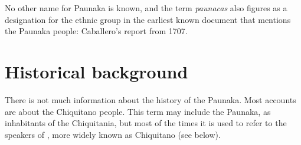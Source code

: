 No other name for Paunaka is known, and the term \textit{paunacas} also figures as a designation for the ethnic group in the earliest known document that mentions the Paunaka people: Caballero’s report from 1707. %



\section{Historical background}\label{sec:HistoricalBackground}

There is not much information about the history of the Paunaka. Most accounts are about the Chiquitano people. This term may include the Paunaka, as inhabitants of the Chiquitania, but most of the times it is used to refer to the speakers of , more widely known as Chiquitano (see below). 

